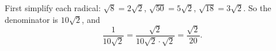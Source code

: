 First simplify each radical: $\sqrt8=2\sqrt2$, $\sqrt{50}=5\sqrt2$, $\sqrt{18}=3\sqrt2$. So the denominator is $10\sqrt2$, and
\[
\dfrac{1}{10\sqrt2}=\dfrac{\sqrt2}{10\sqrt2\cdot\sqrt2}=\boxed{\dfrac{\sqrt2}{20}}.
\]
